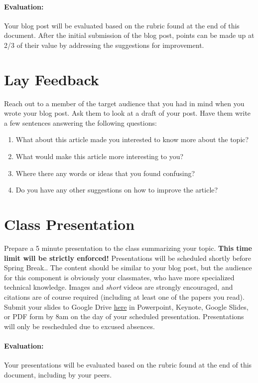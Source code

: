 \documentclass[11pt]{article}
\begin{document}
\paragraph{Evaluation:} 
Your blog post will be evaluated based on the rubric found at the end of this document.  
After the initial submission of the blog post, points can be made up at 2/3 of their value by addressing the suggestions for improvement.


\section{Lay Feedback}
Reach out to a member of the target audience that you had in mind when you wrote your blog post.  Ask them to look at a draft of your post.  Have them write a few sentences answering the following questions: 
\begin{enumerate}
\item What about this article made you interested to know more about the topic?
\item What would make this article more interesting to you?
\item Where there any words or ideas that you found confusing? 
\item Do you have any other suggestions on how to improve the article?
\end{enumerate}


\section{Class Presentation}
Prepare a 5 minute presentation to the class summarizing your topic.  {\bf This time limit will be strictly enforced!}
Presentations will be scheduled shortly before Spring Break..   
The content should be similar to your blog post, but the audience for this component is obviously your classmates, who have more specialized technical knowledge.  
Images and \emph{short} videos are strongly encouraged, and citations are of course required (including at least one of the papers you read).   
Submit your slides to Google Drive \href{https://drive.google.com/drive/folders/1acV3yN3BzQR8oLNvmK3L5cnOHd7DqflE?usp=sharing}{here} in Powerpoint, Keynote, Google Slides, or PDF form by 8am on the day of your scheduled presentation.  Presentations will only be rescheduled due to excused absences.

\paragraph{Evaluation:} 
Your presentations will be evaluated based on the rubric found at the end of this document, including by your peers.
\end{document}
